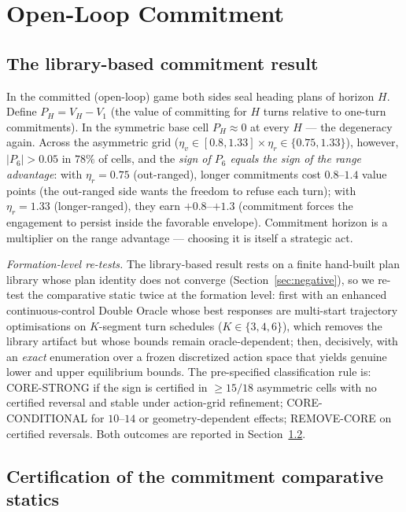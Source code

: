 \documentclass[12pt,a4paper]{article}
\newcommand{\etav}{\eta_v}
\newcommand{\etar}{\eta_r}
\begin{document}
\section{Open-Loop Commitment}\label{sec:commitment-section}

\subsection{The library-based commitment result}\label{sec:commitment}

In the committed (open-loop) game both sides seal heading plans of horizon
$H$.  Define $P_H=V_H-V_1$ (the value of committing for $H$ turns relative
to one-turn commitments).  In the symmetric base cell $P_H\approx0$ at
every $H$ --- the degeneracy again.  Across the asymmetric grid
($\etav\in[0.8,1.33]\times\etar\in\{0.75,1.33\}$), however,
$|P_6|>0.05$ in $78\%$ of cells, and the \emph{sign of $P_6$ equals the
sign of the range advantage}: with $\etar=0.75$ (out-ranged), longer
commitments cost $0.8$--$1.4$ value points (the out-ranged side wants the
freedom to refuse each turn); with $\etar=1.33$ (longer-ranged), they earn
$+0.8$--$+1.3$ (commitment forces the engagement to persist inside the
favorable envelope).  Commitment horizon is a multiplier on the range
advantage --- choosing it is itself a strategic act.

\noindent\emph{Formation-level re-tests.}  The library-based result rests on
a finite hand-built plan library whose plan identity does not converge
(Section~\ref{sec:negative}), so we re-test the comparative static twice at
the formation level: first with an enhanced continuous-control Double
Oracle whose best responses are multi-start trajectory optimisations on
$K$-segment turn schedules ($K\in\{3,4,6\}$), which removes the library
artifact but whose bounds remain oracle-dependent; then, decisively, with
an \emph{exact} enumeration over a frozen discretized action space that
yields genuine lower and upper equilibrium bounds.  The pre-specified
classification rule is: CORE-STRONG if the sign is certified in $\ge15/18$
asymmetric cells with no certified reversal and stable under
action-grid refinement; CORE-CONDITIONAL for $10$--$14$ or
geometry-dependent effects; REMOVE-CORE on certified reversals.  Both
outcomes are reported in Section~\ref{sec:commitment-result}.

\subsection{Certification of the commitment comparative statics}\label{sec:commitment-result}
\end{document}
